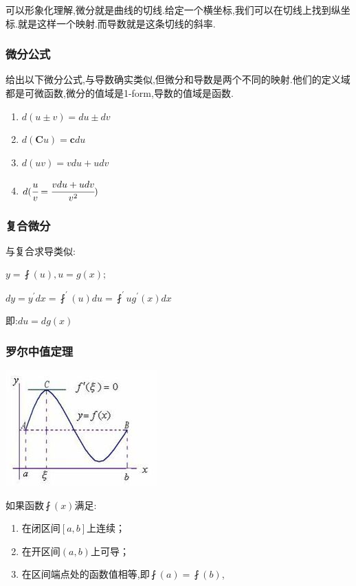 \documentclass[UTF8,12pt]{ctexbook}
\newcommand{\derivative}{^\prime}
\begin{document}
{{{可以形象化理解,微分就是曲线的切线.给定一个横坐标,我们可以在切线上找到纵坐标.就是这样一个映射.而导数就是这条切线的斜率.

\subsubsection{微分公式}{
  给出以下微分公式,与导数确实类似,但微分和导数是两个不同的映射.他们的定义域都是可微函数,微分的值域是1-form,导数的值域是函数.
  \begin{enumerate}
    \item $d(u \pm v) = du \pm dv$
    \item $d(\mathbf{C}u) = \mathbf{c}du$
    \item $d(uv) = vdu + udv$
    \item $d(\cfrac{u}{v} = \cfrac{vdu + udv}{v^2})$
  \end{enumerate}
}%

\subsubsection{复合微分}{
  与复合求导类似:

  $y = \fint(u), u = g(x);$

  $dy = y\derivative dx = \fint\derivative(u)du = \fint\derivative{u}g\derivative(x)dx$

  即:$du = dg(x)$
}%

\subsubsection{罗尔中值定理}{
  \includegraphics{resources/Rolle's_mean_value_theorem.jpg}

  如果函数$\fint(x)$满足:

  \begin{enumerate}
    \item 在闭区间$[a,b]$上连续；
    \item 在开区间$(a,b)$上可导；
    \item 在区间端点处的函数值相等,即$\fint(a) = \fint(b)$,
  \end{enumerate}

}}}}
\end{document}
